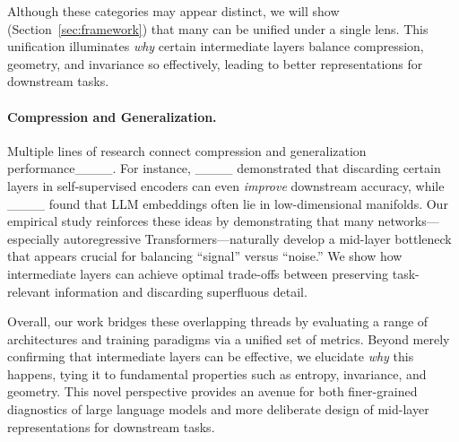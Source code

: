 

Although these categories may appear distinct, we will show (Section~\ref{sec:framework}) that many can be unified under a single lens. This unification illuminates \emph{why} certain intermediate layers balance compression, geometry, and invariance so effectively, leading to better representations for downstream tasks.

\paragraph{Compression and Generalization.}

Multiple lines of research connect compression and generalization performance____. For instance, ____ demonstrated that discarding certain layers in self-supervised encoders can even \emph{improve} downstream accuracy, while ____ found that LLM embeddings often lie in low-dimensional manifolds. Our empirical study reinforces these ideas by demonstrating that many networks—especially autoregressive Transformers—naturally develop a mid-layer bottleneck that appears crucial for balancing “signal” versus “noise.” We show how intermediate layers can achieve optimal trade-offs between preserving task-relevant information and discarding superfluous detail.




Overall, our work bridges these overlapping threads by evaluating a range of architectures and training paradigms via a unified set of metrics. Beyond merely confirming that intermediate layers can be effective, we elucidate \emph{why} this happens, tying it to fundamental properties such as entropy, invariance, and geometry. This novel perspective provides an avenue for both finer-grained diagnostics of large language models and more deliberate design of mid-layer representations for downstream tasks.



